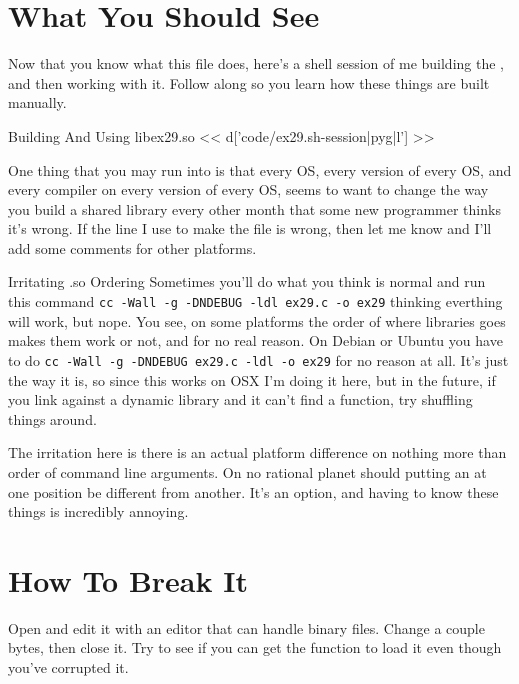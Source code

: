\section{What You Should See}

Now that you know what this file does, here's a shell session of me building
the ,  and then working with it.  Follow
along so you learn how these things are built manually.

\begin{code}{Building And Using libex29.so}
<< d['code/ex29.sh-session|pyg|l'] >>
\end{code}

One thing that you may run into is that every OS, every version of every
OS, and every compiler on every version of every OS, seems to want to change
the way you build a shared library every other month that some new programmer
thinks it's wrong.  If the line I use to make the  file is
wrong, then let me know and I'll add some comments for other platforms.

\begin{aside}{Irritating .so Ordering}
Sometimes you'll do what you think is normal and run this command
\verb|cc -Wall -g -DNDEBUG -ldl ex29.c -o ex29| thinking everthing
will work, but nope.  You see, on some platforms the order of where 
libraries goes makes them work or not, and for no real reason.  On
Debian or Ubuntu you have to do
\verb|cc -Wall -g -DNDEBUG ex29.c -ldl -o ex29| for no reason at all.
It's just the way it is, so since this works on OSX I'm doing it
here, but in the future, if you link against a dynamic library and
it can't find a function, try shuffling things around.

The irritation here is there is an actual platform difference on nothing
more than order of command line arguments.  On no rational planet should
putting an  at one position be different from another.  It's an
option, and having to know these things is incredibly annoying.
\end{aside}

\section{How To Break It}

Open  and edit it with an editor that can handle
binary files.  Change a couple bytes, then close it.  Try to see
if you can get the  function to load it even though
you've corrupted it.

